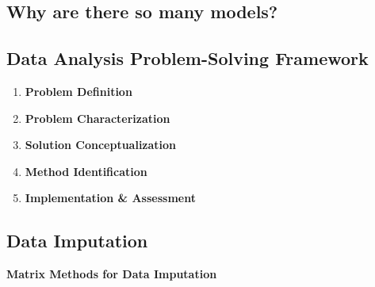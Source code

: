 \documentclass[11pt,a4paper]{article}
\theoremstyle{definition}
\begin{document}
\begin{examplebox}
\vspace{70mm}
\end{examplebox}


\subsection*{Why are there so many models?}
\vspace{50mm}

\subsection*{Data Analysis Problem-Solving Framework}

\begin{defbox}
\begin{enumerate}
    \item \textbf{Problem Definition}
    \item \textbf{Problem Characterization}
    \item \textbf{Solution Conceptualization}
    \item \textbf{Method Identification}
    \item \textbf{Implementation \& Assessment}
\end{enumerate}
\end{defbox}


\subsection*{Data Imputation}

\vspace{50mm}


\textbf{Matrix Methods for Data Imputation}

\begin{examplebox}
\vspace{240mm}
\end{examplebox}

\begin{examplebox}
\vspace{240mm}
\end{examplebox}
\end{document}
